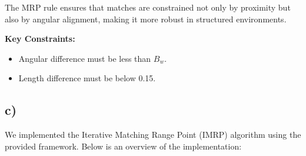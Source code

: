 \documentclass[template,12pt,a4paper,enabledeprecatedfontcommands]{template}
\begin{document}
The MRP rule ensures that matches are constrained not only by proximity but also by angular alignment, making it more robust in structured environments. 

\textbf{Key Constraints:}
\begin{itemize}
    \item Angular difference must be less than \(B_w\).
    \item Length difference must be below 0.15.
\end{itemize}


\subsection{c)}

We implemented the Iterative Matching Range Point (IMRP) algorithm using the provided framework. Below is an overview of the implementation:
\end{document}
